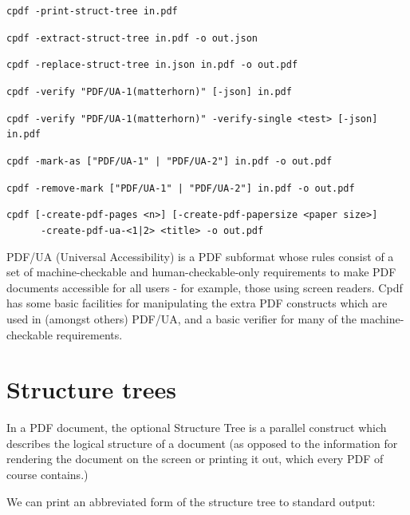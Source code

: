 \documentclass{book}
\begin{document}
  {\small\begin{framed}
  \noindent\verb!cpdf -print-struct-tree in.pdf!

  \vspace{1.5mm}
  \noindent\verb!cpdf -extract-struct-tree in.pdf -o out.json!

  \vspace{1.5mm}
  \noindent\verb!cpdf -replace-struct-tree in.json in.pdf -o out.pdf!

  \vspace{1.5mm}
  \noindent\verb!cpdf -verify "PDF/UA-1(matterhorn)" [-json] in.pdf!

  \vspace{1.5mm}
  \noindent\verb!cpdf -verify "PDF/UA-1(matterhorn)" -verify-single <test> [-json] in.pdf!

  \vspace{1.5mm}
  \noindent\verb!cpdf -mark-as ["PDF/UA-1" | "PDF/UA-2"] in.pdf -o out.pdf!

  \vspace{1.5mm}
  \noindent\verb!cpdf -remove-mark ["PDF/UA-1" | "PDF/UA-2"] in.pdf -o out.pdf!

  \vspace{1.5mm}
  \noindent\verb!cpdf [-create-pdf-pages <n>] [-create-pdf-papersize <paper size>]!\\
  \noindent\verb!      -create-pdf-ua-<1|2> <title> -o out.pdf!

  \end{framed}}

PDF/UA (Universal Accessibility) is a PDF subformat whose rules consist of a set of machine-checkable and human-checkable-only requirements to make PDF documents accessible for all users - for example, those using screen readers. Cpdf has some basic facilities for manipulating the extra PDF constructs which are used in (amongst others) PDF/UA, and a basic verifier for many of the machine-checkable requirements.

\section{Structure trees}

In a PDF document, the optional Structure Tree is a parallel construct which describes the logical structure of a document (as opposed to the information for rendering the document on the screen or printing it out, which every PDF of course contains.)

We can print an abbreviated form of the structure tree to standard output:
\end{document}
